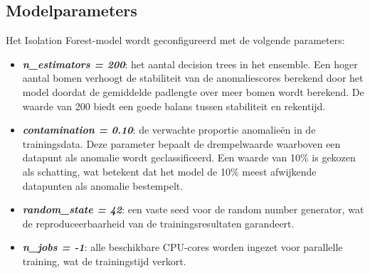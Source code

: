     
    
    

\subsection{Modelparameters} 
\label{subsec:modelparameters}

Het Isolation Forest-model wordt geconfigureerd met de volgende parameters:

\begin{itemize}
    \item \textbf{\textit{n\_estimators = 200}}: het aantal decision trees in het ensemble. Een hoger aantal bomen verhoogt de stabiliteit van de anomaliescores berekend door het model doordat de gemiddelde padlengte over meer bomen wordt berekend. De waarde van 200 biedt een goede balans tussen stabiliteit en rekentijd.
    \item \textbf{\textit{contamination = 0.10}}: de verwachte proportie anomalieën in de trainingsdata. Deze parameter bepaalt de drempelwaarde waarboven een datapunt als anomalie wordt geclassificeerd. Een waarde van 10\%  is gekozen als schatting, wat betekent dat het model de 10\%  meest afwijkende datapunten als anomalie bestempelt.
    \item \textbf{\textit{random\_state = 42}}: een vaste seed voor de random number generator, wat de reproduceerbaarheid van de trainingsresultaten garandeert.
    \item \textbf{\textit{n\_jobs = -1}}: alle beschikbare CPU-cores worden ingezet voor parallelle training, wat de trainingstijd verkort.
\end{itemize}


